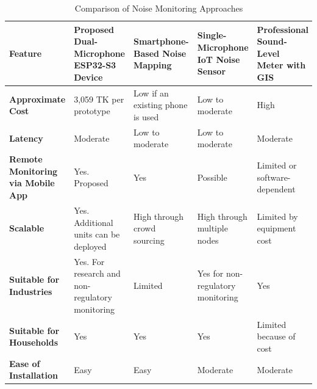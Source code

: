 \documentclass[conference]{IEEEtran}
\begin{document}
\begin{table}[htbp]
\caption{Comparison of Noise Monitoring Approaches}
\label{tab:comparison}
\begin{center}
\scriptsize
\begin{tabular}{|p{1.35cm}|p{1.55cm}|p{1.55cm}|p{1.55cm}|p{1.55cm}|}
\hline
\textbf{Feature} &
\textbf{Proposed Dual-Microphone ESP32-S3 Device} &
\textbf{Smartphone-Based Noise Mapping} &
\textbf{Single-Microphone IoT Noise Sensor} &
\textbf{Professional Sound-Level Meter with GIS} \\
\hline

\textbf{Approximate Cost} &
3,059 TK per prototype &
Low if an existing phone is used &
Low to moderate &
High \\
\hline

\textbf{Latency} &
Moderate &
Low to moderate &
Low to moderate &
Moderate \\
\hline

\textbf{Remote Monitoring via Mobile App} &
Yes. Proposed &
Yes &
Possible &
Limited or software-dependent \\
\hline

\textbf{Scalable} &
Yes. Additional units can be deployed &
High through crowd sourcing &
High through multiple nodes &
Limited by equipment cost \\
\hline

\textbf{Suitable for Industries} &
Yes. For research and non-regulatory monitoring &
Limited &
Yes for non-regulatory monitoring &
Yes \\
\hline

\textbf{Suitable for Households} &
Yes &
Yes &
Yes &
Limited because of cost \\
\hline

\textbf{Ease of Installation} &
Easy &
Easy &
Moderate &
Moderate \\
\hline

\end{tabular}
\end{center}
\end{table}
\end{document}
